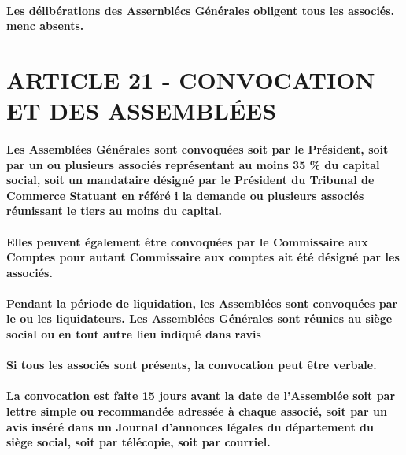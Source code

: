 \documentclass[a4paper, 11pt]{article}
\begin{document}
\paragraph{
  Les délibérations des Assernblécs Générales obligent tous les associés. menc absents.
}

\section*{ARTICLE 21 - CONVOCATION ET DES ASSEMBLÉES}

\paragraph{
  Les Assemblées Générales sont convoquées soit par le Président, soit par un ou plusieurs associés représentant au moins 35 \% du capital social, soit un mandataire désigné par le Président du Tribunal de Commerce Statuant en référé i la demande ou plusieurs associés réunissant le tiers au moins du capital.
}

\paragraph{
  Elles peuvent également être convoquées par le Commissaire aux Comptes pour autant Commissaire aux comptes ait été désigné par les associés.
}

\paragraph{
  Pendant la période de liquidation, les Assemblées sont convoquées par le ou les liquidateurs. Les Assemblées Générales sont réunies au siège social ou en tout autre lieu indiqué dans ravis
}

\paragraph{
  Si tous les associés sont présents, la convocation peut être verbale.
}

\paragraph{
  La convocation est faite 15 jours avant la date de l'Assemblée soit par lettre simple ou recommandée adressée à chaque associé, soit par un avis inséré dans un Journal d'annonces légales du département du siège social, soit par télécopie, soit par courriel.
}
\end{document}
